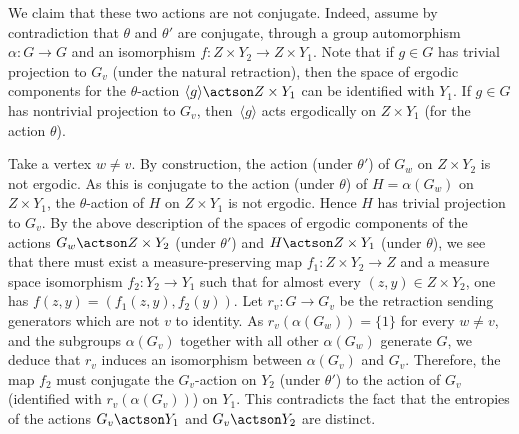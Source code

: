 \begin{rk}
We claim that these two actions are not conjugate. Indeed, assume by contradiction that $\theta$ and $\theta'$ are conjugate, through a group automorphism $\alpha:G\to G$ and an isomorphism $f:Z\times Y_2\to Z\times Y_1$. Note that if $g\in G$ has trivial projection to $G_v$ (under the natural retraction), then the space of ergodic components for the $\theta$-action $\langle g\rangle \actson Z\times Y_1$ can be identified with $Y_1$. If $g\in G$ has nontrivial projection to $G_v$, then~$\langle g\rangle$ acts ergodically on $Z\times Y_1$ (for the action $\theta$).

Take a vertex $w\neq v$. By construction, the action (under $\theta'$) of $G_w$ on $Z\times Y_2$ is not ergodic. As this is conjugate to the action (under $\theta$) of $H=\alpha(G_w)$ on $Z\times Y_1$, the $\theta$-action of $H$ on $Z\times Y_1$ is not ergodic. Hence $H$ has trivial projection to $G_{v}$. By the above description of the spaces of ergodic components of the actions $G_w\actson Z\times Y_2$ (under $\theta'$) and $H\actson Z\times Y_1$ (under $\theta$), we see that there must exist a measure-preserving map $f_1:Z\times Y_2\to Z$ and a measure space isomorphism $f_2:Y_2\to Y_1$ such that for almost every $(z,y)\in Z\times Y_2$, one has $f(z,y)=(f_1(z,y),f_2(y))$. Let $r_v:G\to G_v$ be the retraction sending generators which are not $v$ to identity. As $r_v(\alpha(G_w))=\{1\}$ for every $w\neq v$, and the subgroups $\alpha(G_v)$ together with all other $\alpha(G_w)$ generate $G$, we deduce that $r_v$ induces an isomorphism between $\alpha(G_v)$ and $G_v$. Therefore, the map $f_2$ must conjugate the $G_v$-action on $Y_2$ (under $\theta'$) to the action of $G_v$ (identified with $r_v(\alpha(G_v))$) on $Y_1$. This contradicts the fact that the entropies of the actions $G_v\actson Y_1$ and $G_v\actson Y_2$ are distinct.


\end{rk}
